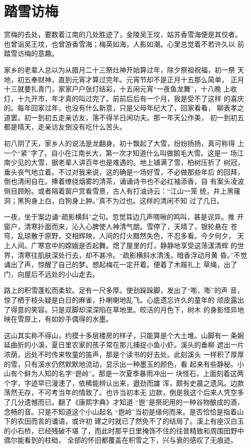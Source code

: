 \chapter{踏雪访梅}

赏梅的去处，要数着江南的几处胜迹了，金陵吴王坟，姑苏香雪海便是其佼者。
也曾诣吴王坟，也曾游香雪海；梅英如海，人影如潮。心里总觉着不若许久以
前踏雪访梅的意趣。

家乡的老辈人总以为从腊月二十三祭灶神开始算过年，除夕祭祖祝福，初一祭
天地，初五奉财神，直到元宵才算过完年。元宵节却不是正月十五那么简单，
正月十三就要扎青门，家家户户张灯结彩，十五闹元宵“一夜鱼龙舞”，十八晚
上收灯，十九开市，年才真的叫过完了。前前后后有一个月，我是受不了这样
的喜庆的。每年回家过年，也没有什么新意，只是父母年纪大了，回家看看，
聊表孝之道罢。初一到初五走亲访友，落不得半日闲功夫。那一年天公作美，
初一到初五都是晴天，走亲访友倒没有吃什么苦头。

初八阴了天，家乡人的说法是龙翻身。初十飘起了大雪，纷纷扬扬，真可称得
上一个“紧”字了。自小在江南长大，第一次才知道什么叫做鹅毛大雪。这是一
场江南少见的大雪，据老辈人讲百年也是难遇的。地上铺满了雪，柏树压折了
树冠，垂头丧气地立着。不过对我来说，这的确是一场好雪，不必做那些年后
的回拜，倒也清闲自在。捧着缭绕烟雾的清茶，诵诵诗书也不必红袖添香，自
有案头凌波侧目顾盼。或者隔着窗户赏看雪景，古人有打油诗云：“江山一笼
统，井上黑窿洞；黑狗身上白，白狗身上肿。”真不为过也。这样的清闲不知
过了几日。

一夜，坐于案边诵“疏影横斜”之句。忽觉耳边几声啁啾的鸣叫，甚是诧异。推
开窗户，清寒扑面而来，沁入心脾使人神清气朗。雪停了，天晴了，银轮悬在
苍穹，乱琼散于原野，交相辉映，人间的灯火黯然失色，不忍多看。今夕何夕，
天上人间。广寒宫中的嫦娥是否起舞。熄了屋里的灯，静静地享受这荡漾清辉
的世界，清寒往肌肤深处行去，却不甚冷。“疏影横斜水清浅，暗香浮动月黄
昏。”不觉诵出了声，惊醒了自己的梦。想起梅花一定开着。便着了木屐扎上
草绳，出了门，向屋后不远处的小山走去。

路上的积雪蓬松而柔软。足有一尺多厚。使劲跺跺脚，发出了“嘭、嘭”的声
音，惊了栖于枝头疑是白日的麻雀，扑喇喇地乱飞。心底遗忘许久的童年的
顽皮露出了得意的笑容。只是双脚却深深陷在草地里。皎洁的月色下，树木
的身影怪异地映在雪原上，有如妙手偶得的水墨。

这山其实称不得山，约摸十多层楼房的样子，只能算是个大土堆。山脚有一
条婉延曲折的小溪，夏日里农家的孩子常在那儿捕捉小鱼小虾。溪头的垂柳
遮出一片浓荫，远处不时传来牧童的笛声，那是个读书的好去处。此刻溪头
一样积了厚厚的雪，只有溪水仍然默默地流动，显示出一种墨玉的颜色，看
起来有些静秘。小山有个鲜为人知的名字“鬯岭”。那是一次夏季暴雨冲出一
块怪石，上面刻着这两个字，字迹早已漫漶了，依稀能辨认出来，遒劲而雄
浑，颇有史晨之遗风。边款荡然无存，不可考当年的情致了。也许当初本无
边款，倒是我这个后来人凭空多了几分遗憾而已。翻了《康熙字典》才知道
“鬯”是祭祀用的一种谷物酿成的酒，念畅的音。只是不知道这个小山起名
“鬯岭”当初是缘何而来。是否恰恰是指着山下的农田而言的谶语，或许初
建之时就已了然免不了的结局了。溪上有座汉白玉的小石桥，已经残破不堪
了，而此时那平日里掩饰不住的往昔精致和周围田野中偶尔能看到的柱础，
全部的怀旧都覆盖在积雪之下，兴与衰的感叹了无痕迹。

